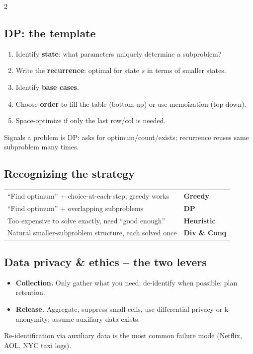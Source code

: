 \documentclass[10pt]{article}
\begin{document}
\begin{multicols}{2}
\subsection*{DP: the template}
\begin{enumerate}
    \item Identify \textbf{state}: what parameters uniquely determine a
    subproblem?
    \item Write the \textbf{recurrence}: optimal for state $s$ in terms
    of smaller states.
    \item Identify \textbf{base cases}.
    \item Choose \textbf{order} to fill the table (bottom-up) or use
    memoization (top-down).
    \item Space-optimize if only the last row/col is needed.
\end{enumerate}
Signals a problem is DP: asks for optimum/count/exists; recurrence
reuses same subproblem many times.

\subsection*{Recognizing the strategy}
\begin{tabular}{@{}lp{4cm}@{}}
``Find optimum'' + choice-at-each-step, greedy works &
\textbf{Greedy}\\
``Find optimum'' + overlapping subproblems   & \textbf{DP}\\
Too expensive to solve exactly, need ``good enough'' & \textbf{Heuristic}\\
Natural smaller-subproblem structure, each solved once & \textbf{Div \& Conq}
\end{tabular}

\subsection*{Data privacy \& ethics -- the two levers}
\begin{itemize}
    \item \textbf{Collection.} Only gather what you need; de-identify
    when possible; plan retention.
    \item \textbf{Release.} Aggregate, suppress small cells, use
    differential privacy or k-anonymity; assume auxiliary data exists.
\end{itemize}
Re-identification via auxiliary data is the most common failure mode
(Netflix, AOL, NYC taxi logs).


\end{multicols}
\end{document}
